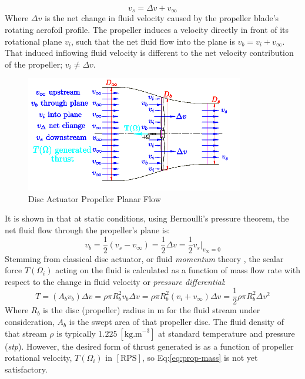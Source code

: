 \begin{equation}
v_s = \Delta v + v_\infty
\end{equation}
Where $\Delta v$ is the net change in fluid velocity caused by the propeller blade's rotating aerofoil profile. The propeller induces a velocity directly in front of its rotational plane $v_i$, such that the net fluid flow into the plane is $v_b=v_i+v_\infty$. That induced inflowing fluid velocity is different to the net velocity contribution of the propeller; $v_i\not=\Delta v$.
\par
\begin{figure}[htbp]
\centering
\includegraphics[width=0.85\textwidth]{figs/bem-flow}
\vspace{-12pt}
\caption{Disc Actuator Propeller Planar Flow}
\label{fig:bem-flow}
\vspace{-15pt}
\end{figure}
It is shown in \cite{bladesforquadrotors} that at static conditions, using Bernoulli's pressure theorem, the net fluid flow through the propeller's plane is:
\begin{equation}\label{eq:bernoulli}
v_b = \frac{1}{2} ( v_s - v_{\infty} ) = \frac{1}{2} \Delta v = \frac{1}{2} v_s \big|_{v_\infty=0}
\end{equation}
Stemming from classical disc actuator, or fluid \emph{momentum} theory \cite{fluidmomentum,propellers}, the scalar force $T(\Omega_i)$ acting on the fluid is calculated as a function of mass flow rate with respect to the change in fluid velocity or \emph{pressure differential}:
\begin{equation}\label{eq:prop-mass}
T=(A_b v_b)\Delta v = \rho \pi R_b^2v_b \Delta v = \rho \pi R_b^2(v_i+v_\infty)\Delta v = \frac{1}{2} \rho \pi R_b^2 \Delta v^2
\end{equation}
Where $R_b$ is the disc (propeller) radius in $\text{m}$ for the fluid stream under consideration, $A_b$ is the swept area of that propeller disc. The fluid density of that stream $\rho$ is typically $1.225~[\text{kg.m}^{-3}]$ at standard temperature and pressure (\emph{stp}). However, the desired form of thrust generated is as a function of propeller rotational velocity, $T(\Omega_i)$ in $[\text{RPS}]$, so Eq:\ref{eq:prop-mass} is not yet satisfactory. 
